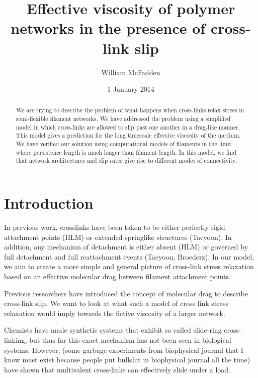 \documentclass[prb,11pt]{revtex4-1}
\begin{document}
\title{Effective viscosity of polymer networks in the presence of cross-link slip}
\author{William McFadden}

\date{1 January 2014}

\begin{abstract}
We are trying to describe the problem of what happens when cross-links relax stress in semi-flexible filament networks.  We have addressed the problem using a simplified model in which cross-links are allowed to slip past one another in a drag-like manner.  This model gives a prediction for the long timescale effective viscosity of the medium.  We have verified our solution using computational models of filaments in the limit where persistence length is much longer than filament length.  In this model, we find that network architectures and slip rates give rise to different modes of connectivity.
\end{abstract}

\maketitle

\section{Introduction}

In previous work, crosslinks have been taken to be either perfectly rigid attachment points (HLM) or extended springlike structures (Taeyoon).  In addition, any mechanism of detachment is either absent (HLM) or governed by full detachment and full reattachment events (Taeyoon, Broederz).  In our model, we aim to create a more simple and general picture of cross-link stress relaxation based on an effective molecular drag between filament attachment points.

Previous researchers have introduced the concept of molecular drag to describe cross-link slip.  We want to look at what such a model of cross link stress relaxation would imply towards the fictive viscosity of a larger network.

Chemists have made synthetic systems that exhibit so called slide-ring cross-linking, but thus far this exact mechanism has not been seen in biological systems.  However, (some garbage experiments from biophysical journal that I know must exist because people put bullshit in biophysical journal all the time) have shown that multivalent cross-links can effectively slide under a load.
\end{document}
